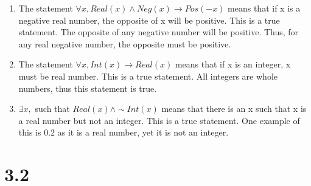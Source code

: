 \documentclass{article}
\begin{document}
\begin{enumerate}
\begin{enumerate}
        \item The statement $\forall x, Real(x) \land Neg(x) \rightarrow Pos(-x)$ means that if x is a negative real number, the opposite of x will be positive. This is a true statement. The opposite of any negative number will be positive. Thus, for any real negative number, the opposite must be positive.
        \item The statement $\forall x, Int(x) \rightarrow Real(x)$ means that if x is an integer, x must be real number. This is a true statement. All integers are whole numbers, thus this statement is true.
        \item $\exists x, $ such that $Real(x) \land \sim Int(x)$ means that there is an x such that x is a real number but not an integer. This is a true statement. One example of this is 0.2 as it is a real number, yet it is not an integer.
     \end{enumerate}
 \end{enumerate}
  
\section{3.2}
\end{document}
